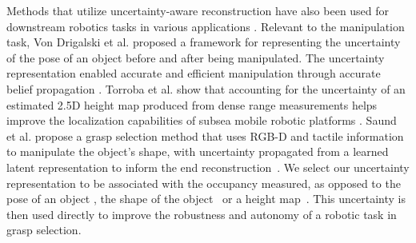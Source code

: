 Methods that utilize uncertainty-aware reconstruction have also been used for downstream robotics tasks in various applications \cite{von_drigalski_uncertainty-aware_2022, torroba_fully-probabilistic_2022, 10093134, pmlr-v164-saund22a}.
Relevant to the manipulation task, Von Drigalski et al. proposed a framework for representing the uncertainty of the pose of an object before and after being manipulated. 
The uncertainty representation enabled accurate and efficient manipulation through accurate belief propagation \cite{von_drigalski_uncertainty-aware_2022}.
Torroba et al. show that accounting for the uncertainty of an estimated 2.5D height map produced from dense range measurements helps improve the localization capabilities of subsea mobile robotic platforms \cite{torroba_fully-probabilistic_2022, 10093134}.
Saund et al. propose a grasp selection method that uses RGB-D and tactile information to manipulate the object's shape, with uncertainty propagated from a learned latent representation to inform the end reconstruction~\cite{pmlr-v164-saund22a}.
We select our uncertainty representation to be associated with the occupancy measured, as opposed to the pose of an object \cite{von_drigalski_uncertainty-aware_2022}, the shape of the object~\cite{pmlr-v164-saund22a} or a height map~\cite{torroba_fully-probabilistic_2022, 10093134}.
This uncertainty is then used directly to improve the robustness and autonomy of a robotic task in grasp selection.
